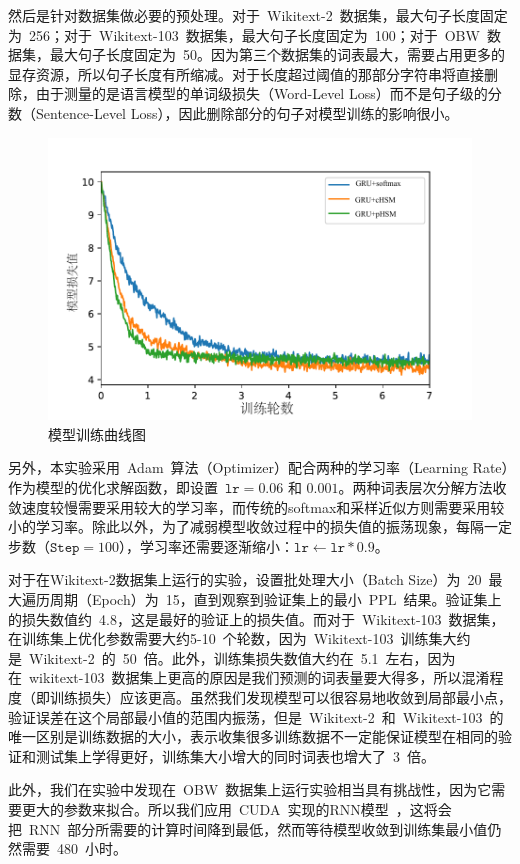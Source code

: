 然后是针对数据集做必要的预处理。对于~Wikitext-2~数据集，最大句子长度固定为~256；对于~Wikitext-103~数据集，最大句子长度固定为~100；对于~OBW~数据集，最大句子长度固定为~50。因为第三个数据集的词表最大，需要占用更多的显存资源，所以句子长度有所缩减。对于长度超过阈值的那部分字符串将直接删除，由于测量的是语言模型的单词级损失（Word-Level Loss）而不是句子级的分数（Sentence-Level Loss），因此删除部分的句子对模型训练的影响很小。

\begin{figure}[!t]
  \centering
  \includegraphics[width=0.6\columnwidth]{./figures/learn2.pdf}
  \caption{模型训练曲线图}
\end{figure}

另外，本实验采用~Adam~算法（Optimizer）配合两种的学习率（Learning Rate）作为模型的优化求解函数，即设置~$\mathtt{lr}  = 0.06$ 和 $0.001 $。两种词表层次分解方法收敛速度较慢需要采用较大的学习率，而传统的softmax和采样近似方则需要采用较小的学习率。除此以外，为了减弱模型收敛过程中的损失值的振荡现象，每隔一定步数（$\texttt{Step} =100$），学习率还需要逐渐缩小：$\texttt{lr}\leftarrow\texttt{lr}*0.9$。

对于在Wikitext-2数据集上运行的实验，设置批处理大小（Batch Size）为~20~最大遍历周期（Epoch）为~15，直到观察到验证集上的最小~$\mathrm{PPL}$~结果。验证集上的损失数值约~4.8，这是最好的验证上的损失值。而对于~Wikitext-103~数据集，在训练集上优化参数需要大约5-10~个轮数，因为~Wikitext-103~训练集大约是~Wikitext-2~的~50~倍。此外，训练集损失数值大约在~5.1~左右，因为在~wikitext-103~数据集上更高的原因是我们预测的词表量要大得多，所以混淆程度（即训练损失）应该更高。虽然我们发现模型可以很容易地收敛到局部最小点，验证误差在这个局部最小值的范围内振荡，但是~Wikitext-2~和~Wikitext-103~的唯一区别是训练数据的大小，表示收集很多训练数据不一定能保证模型在相同的验证和测试集上学得更好，训练集大小增大的同时词表也增大了~3~倍。

此外，我们在实验中发现在~OBW~数据集上运行实验相当具有挑战性，因为它需要更大的参数来拟合。所以我们应用~CUDA~实现的RNN模型~，这将会把~RNN~部分所需要的计算时间降到最低，然而等待模型收敛到训练集最小值仍然需要~480~小时。

